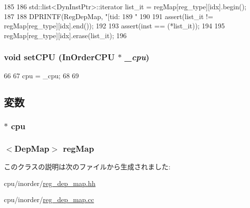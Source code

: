 \begin{DoxyCode}
185 {
186    std::list<DynInstPtr>::iterator list_it = regMap[reg_type][idx].begin();
187 
188    DPRINTF(RegDepMap, "[tid:%
189            "%
190 
191    assert(list_it != regMap[reg_type][idx].end());
192 
193    assert(inst == (*list_it));
194 
195    regMap[reg_type][idx].erase(list_it);
196 }
\end{DoxyCode}
\hypertarget{classRegDepMap_ad9f94f552b2c6a5daf605771891e76e7}{
\subsubsection[{setCPU}]{\setlength{\rightskip}{0pt plus 5cm}void setCPU ({\bf InOrderCPU} $\ast$ {\em \_\-cpu})}}
\label{classRegDepMap_ad9f94f552b2c6a5daf605771891e76e7}



\begin{DoxyCode}
66 {
67     cpu = _cpu;
68 
69 }
\end{DoxyCode}


\subsection{変数}
\hypertarget{classRegDepMap_a41d682c28d0f49e04393c52815808782}{
\subsubsection[{cpu}]{$\ast$ {\bf cpu}}}
\label{classRegDepMap_a41d682c28d0f49e04393c52815808782}
\hypertarget{classRegDepMap_aa6afa28f783151687606a9895fb15789}{
\subsubsection[{regMap}]{$<${\bf DepMap}$>$ {\bf regMap}}}
\label{classRegDepMap_aa6afa28f783151687606a9895fb15789}


このクラスの説明は次のファイルから生成されました:\begin{DoxyCompactItemize}
\item 
cpu/inorder/\hyperlink{reg__dep__map_8hh}{reg\_\-dep\_\-map.hh}\item 
cpu/inorder/\hyperlink{reg__dep__map_8cc}{reg\_\-dep\_\-map.cc}\end{DoxyCompactItemize}
